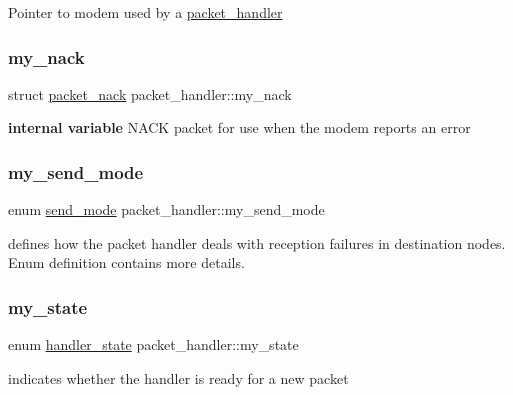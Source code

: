 Pointer to modem used by a \mbox{\hyperlink{structpacket__handler}{packet\+\_\+handler}} \mbox{\label{structpacket__handler_a895701b8c6b074c92ec404167983ff8a}} 
\subsubsection{\texorpdfstring{my\+\_\+nack}{my\_nack}}
{\footnotesize\ttfamily struct \mbox{\hyperlink{structpacket__nack}{packet\+\_\+nack}} packet\+\_\+handler\+::my\+\_\+nack}

{\bfseries internal variable} N\+A\+CK packet for use when the modem reports an error \mbox{\label{structpacket__handler_a42b31c85f9e7c6d40673e279c1506076}} 
\subsubsection{\texorpdfstring{my\+\_\+send\+\_\+mode}{my\_send\_mode}}
{\footnotesize\ttfamily enum \mbox{\hyperlink{packet__handler_8h_a83f2c1e421af1bc836ea53cc416205ab}{send\+\_\+mode}} packet\+\_\+handler\+::my\+\_\+send\+\_\+mode}

defines how the packet handler deals with reception failures in destination nodes. Enum definition contains more details. \mbox{\label{structpacket__handler_a66f2408583b84777de353d0d5955c153}} 
\subsubsection{\texorpdfstring{my\+\_\+state}{my\_state}}
{\footnotesize\ttfamily enum \mbox{\hyperlink{packet__handler_8h_ae26a92a9fe08e1847e90f596f93f24bd}{handler\+\_\+state}} packet\+\_\+handler\+::my\+\_\+state}

indicates whether the handler is ready for a new packet \mbox{\label{structpacket__handler_abbef57602dd517871e774e639135ce30}} 
